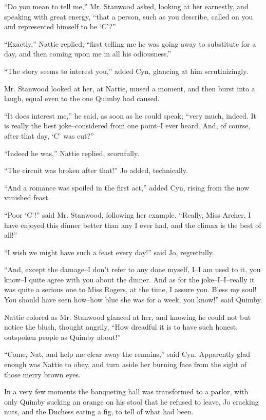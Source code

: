 ``Do you mean to tell me,'' Mr. Stanwood asked, looking at her earnestly,
and speaking with great energy, ``that a person, such as you describe,
called on you and represented himself to be `C'?''

``Exactly,'' Nattie replied; ``first telling me he was going away to
substitute for a day, and then coming upon me in all his odiousness.''

``The story seems to interest you,'' added Cyn, glancing at him
scrutinizingly.

Mr. Stanwood looked at her, at Nattie, mused a moment, and then burst
into a laugh, equal even to the one Quimby had caused.

``It does interest me,'' he said, as soon as he could speak; ``very much,
indeed. It is really the best joke--considered from one point--I ever
heard. And, of course, after that day, `C' was cut?''

``Indeed he was,'' Nattie replied, scornfully.

``The circuit was broken after that!'' Jo added, technically.

``And a romance was spoiled in the first act,'' added Cyn, rising from the
now vanished feast.

``Poor `C'!'' said Mr. Stanwood, following her example. ``Really, Miss
Archer, I have enjoyed this dinner better than any I ever had, and the
climax is the best of all!''

``I wish we might have such a feast every day!'' said Jo, regretfully.

``And, except the damage--I don't refer to any done myself, I--I am used
to it, you know--I quite agree with you about the dinner. And as for the
joke--I--I--really it was quite a serious one to Miss Rogers, at the
time, I assure you. Bless my soul! You should have seen how--how blue
she was for a week, you know!'' said Quimby.

Nattie colored as Mr. Stanwood glanced at her, and knowing he could not
but notice the blush, thought angrily, ``How dreadful it is to have such
honest, outspoken people as Quimby about!''

``Come, Nat, and help me clear away the remains,'' said Cyn. Apparently
glad enough was Nattie to obey, and turn aside her burning face from the
sight of those merry brown eyes.

In a very few moments the banqueting hall was transformed to a parlor,
with only Quimby sucking an orange on his stool that he refused to
leave, Jo cracking nuts, and the Duchess eating a fig, to tell of what
had been.







